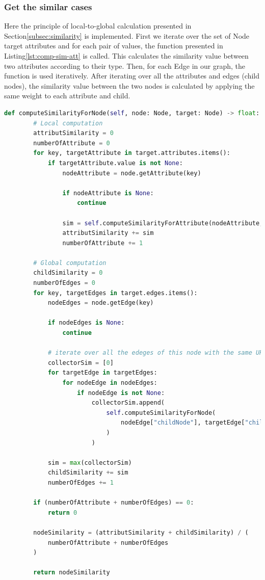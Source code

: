     
    
\subsubsection{Get the similar cases} 
Here the principle of local-to-global calculation presented in Section\ref{subsec:similarity} is implemented. First we iterate over the set of Node target attributes and for each pair of values, the function presented in Listing\ref{lst:comp-sim-att} is called. This calculates the similarity value between two attributes according to their type. Then, for each Edge in our graph, the function is used iteratively.
After iterating over all the attributes and edges (child nodes), the similarity value between the two nodes is calculated by applying the same weight to each attribute and child.\\

\begin{lstlisting}[language=Python, caption=Function to find the similarity between one case and all the cases in the data-base, label={lst:comp-sim-node}]
def computeSimilarityForNode(self, node: Node, target: Node) -> float:
        # Local computation
        attributSimilarity = 0
        numberOfAttribute = 0
        for key, targetAttribute in target.attributes.items():
            if targetAttribute.value is not None:
                nodeAttribute = node.getAttribute(key)

                if nodeAttribute is None:
                    continue

                sim = self.computeSimilarityForAttribute(nodeAttribute, targetAttribute)
                attributSimilarity += sim
                numberOfAttribute += 1

        # Global computation
        childSimilarity = 0
        numberOfEdges = 0
        for key, targetEdges in target.edges.items():
            nodeEdges = node.getEdge(key)

            if nodeEdges is None:
                continue

            # iterate over all the edeges of this node with the same URI
            collectorSim = [0]
            for targetEdge in targetEdges:
                for nodeEdge in nodeEdges:
                    if nodeEdge is not None:
                        collectorSim.append(
                            self.computeSimilarityForNode(
                                nodeEdge["childNode"], targetEdge["childNode"]
                            )
                        )

            sim = max(collectorSim)
            childSimilarity += sim
            numberOfEdges += 1

        if (numberOfAttribute + numberOfEdges) == 0:
            return 0

        nodeSimilarity = (attributSimilarity + childSimilarity) / (
            numberOfAttribute + numberOfEdges
        )

        return nodeSimilarity
\end{lstlisting}



